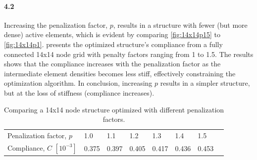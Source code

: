 \paragraph{4.2}
Increasing the penalization factor, $p$, results in a structure with fewer (but more dense) active elements, which is evident by comparing \cref{fig:14x14p15} to \cref{fig:14x14p1}. 
 presents the optimized structure's compliance from a fully connected 14x14 node grid with penalty factors ranging from 1 to 1.5. The results shows that the compliance increases with the penalization factor as the intermediate element densities becomes less stiff, effectively constraining the optimization algorithm. In conclusion, increasing $p$ results in a simpler structure, but at the loss of stiffness (compliance increases).

\vspace{2mm}
\begin{table}[h!]
    \centering
    \caption{Comparing a 14x14 node structure optimized with different penalization factors.}
    \begin{tabular}{@{}llllllll@{}}
    \toprule
   Penalization factor, $p$   & 1.0 & 1.1 & 1.2 & 1.3 & 1.4 & 1.5 \\ 
    Compliance, $C$  $[10^{-3}]$  & 0.375 & 0.397 & 0.405 & 0.417 & 0.436 & 0.453 \\ 
    \bottomrule
    \end{tabular}
    \label{tab:Sub4_pen_comp}
\end{table}
\vspace{4mm}
